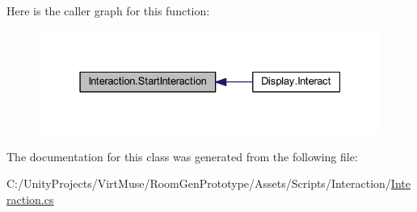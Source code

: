 Here is the caller graph for this function\+:
\nopagebreak
\begin{figure}[H]
\begin{center}
\leavevmode
\includegraphics[width=331pt]{class_interaction_afa5031e1db8f7c23cf26c896937e69f9_icgraph}
\end{center}
\end{figure}


The documentation for this class was generated from the following file\+:\begin{DoxyCompactItemize}
\item 
C\+:/\+Unity\+Projects/\+Virt\+Muse/\+Room\+Gen\+Prototype/\+Assets/\+Scripts/\+Interaction/\mbox{\hyperlink{_interaction_8cs}{Interaction.\+cs}}\end{DoxyCompactItemize}

